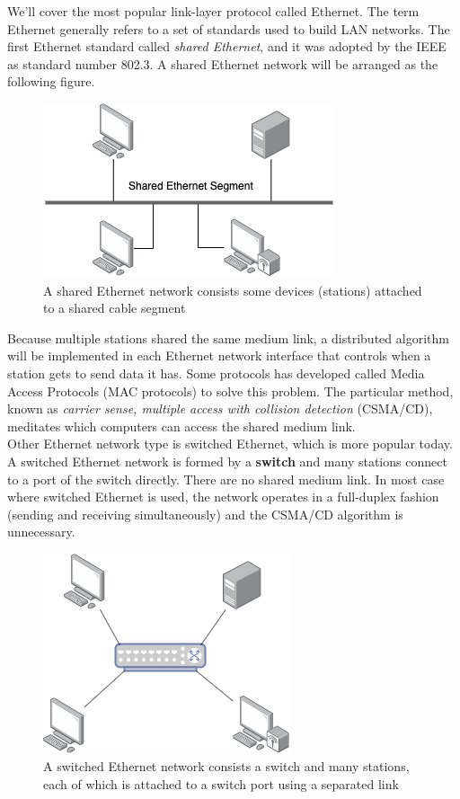 \documentclass[a4paper, 11pt]{article}
\begin{document}
We'll cover the most popular link-layer protocol called Ethernet. The term Ethernet generally refers to a set of standards used to build LAN networks. The first Ethernet standard called \textit{shared Ethernet}, and it was adopted by the IEEE as standard number 802.3. A shared Ethernet network will be arranged as the following figure.\\

\begin{figure}[h]
\includegraphics[scale=0.6]{shared-ethernet.png}
\caption{A shared Ethernet network consists some devices (stations) attached to a shared cable segment}
\end{figure}

Because multiple stations shared the same medium link, a distributed algorithm will be implemented in each Ethernet network interface that controls when a station gets to send data it has. Some protocols has developed called Media Access Protocols (MAC protocols) to solve this problem. The particular method, known as \textit{carrier sense, multiple access with collision detection} (CSMA/CD), meditates which computers can access the shared medium link.\\

Other Ethernet network type is switched Ethernet, which is more popular today. A switched Ethernet network is formed by a \textbf{switch} and many stations connect to a port of the switch directly. There are no shared medium link. In most case where switched Ethernet is used, the network operates in a full-duplex fashion (sending and receiving simultaneously) and the CSMA/CD algorithm is unnecessary.\\

\begin{figure}[h]
\includegraphics[scale=0.6]{switched-ethernet.png}
\caption{A switched Ethernet network consists a switch and many stations, each of which is attached to a switch port using a separated link}
\end{figure}
\end{document}
